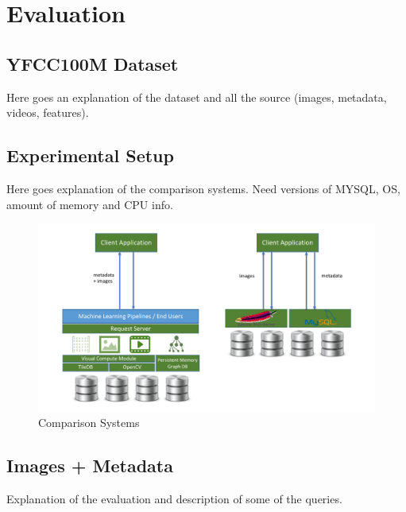 \section{Evaluation}
\label{eval}

\subsection{YFCC100M Dataset}
\label{dataset}

Here goes an explanation of the dataset and all the source
(images, metadata, videos, features).

\subsection{Experimental Setup}

Here goes explanation of the comparison systems.
Need versions of MYSQL, OS, amount of memory and CPU info.

\begin{figure}[]
\centering
\includegraphics[width=\textwidth]{figures/comparison_system}
\caption{Comparison Systems}
\label{fig:systems}
\end{figure}

\subsection{Images + Metadata}

Explanation of the evaluation and description of some of the queries.

